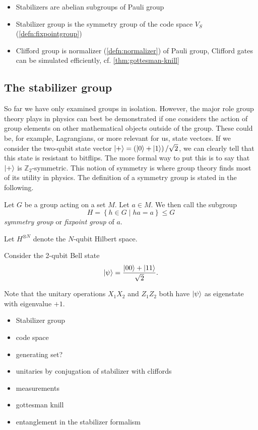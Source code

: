 \begin{itemize}
  \item Stabilizers are abelian subgroups of Pauli group
  \item Stabilizer group is the symmetry group of the code space $V_S$
    (\cref{defn:fixpointgroup})
  \item Clifford group is normalizer (\cref{defn:normalizer}) of Pauli group, Clifford gates can be
    simulated efficiently, cf. \cref{thm:gottesman-knill}
\end{itemize}

\subsection{The stabilizer group}

So far we have only examined groups in isolation. However, the major role group
theory plays in physics can best be demonstrated if one considers the action of
group elements on other mathematical objects outside of the group. These could
be, for example, Lagrangians, or more relevant for us, state vectors. If we
consider the two-qubit state vector $\ket{+} = \left( \ket{0} + \ket{1} \right)
/ \sqrt{2}$, we can clearly tell that this state is resistant to bitflips. The
more formal way to put this is to say that $\ket{+}$ is
$\mathbb{Z}_2$-symmetric. This notion of symmetry is where group theory finds
most of its utility in physics. The definition of a symmetry group is stated in
the following.

\begin{defn}\label{defn:fixpointgroup}
  Let $G$ be a group acting on a set $M$. Let $a\in M$. We then call the
  subgroup
  \[ H = \left\{ h \in G \mid ha = a \right\} \leq G \]
  \emph{symmetry group} or \emph{fixpoint group} of $a$.
\end{defn}
\begin{defn}[Stabilizer]\label{defn:stabilizergroup}
  Let $H^{\otimes N}$ denote the $N$-qubit Hilbert space. 
\end{defn}
Consider the 2-qubit Bell state
\begin{align}
  \ket{\psi} = \frac{\ket{00} + \ket{11}}{\sqrt{2}} 
.\end{align}

Note that the unitary operations $X_1 X_2$ and $Z_1 Z_2$ both have $\ket{\psi}$
as eigenstate with eigenvalue $+1$.

\begin{itemize}
  \item Stabilizer group
  \item code space
  \item generating set?
  \item unitaries by conjugation of stabilizer with cliffords
  \item measurements
  \item gottesman knill
  \item entanglement in the stabilizer formalism
\end{itemize}

